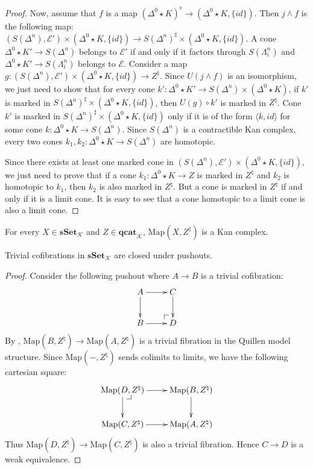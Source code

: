 \documentclass[reqno]{amsart}
\makeatletter
\theoremstyle{definition}
\theoremstyle{remark}
\newcommand{\cat}[1]{\mathbf{#1}}
\newcommand{\sSet}{\cat{sSet}}
\newcommand{\csSet}{\sSet_\mathcal{K}}
\newcommand{\cqCat}{\cat{qcat}_\mathcal{K}}
\newcommand{\join}{\star}
\newcommand{\Map}{\mathrm{Map}}
\numberwithin{figure}{section}
\newcommand{\pb}[1][dr]{\save*!/#1-1.2pc/#1:(-1,1)@^{|-}\restore}
\newcommand{\po}[1][dr]{\save*!/#1+1.2pc/#1:(1,-1)@^{|-}\restore}
\makeatother
\begin{document}
\begin{proof}
Now, assume that $f$ is a map $(\Delta^0 \join K)^\flat \to (\Delta^0 \join K, \{ id \})$.
Then $j \wedge f$ is the following map: $(S(\Delta^n),\mathcal{E}') \times (\Delta^0 \join K, \{ id \}) \to S(\Delta^n)^\sharp \times (\Delta^0 \join K, \{ id \})$.
A cone $\Delta^0 \join K' \to S(\Delta^n)$ belongs to $\mathcal{E}'$ if and only if it factors through $S(\Lambda^n_i)$ and $\Delta^0 \join K' \to S(\Lambda^n_i)$ belongs to $\mathcal{E}$.
Consider a map $g : (S(\Delta^n),\mathcal{E}') \times (\Delta^0 \join K, \{ id \}) \to Z^\natural$.
Since $U(j \wedge f)$ is an isomorphism, we just need to show that for every cone $k' : \Delta^0 \join K' \to S(\Delta^n) \times (\Delta^0 \join K)$,
if $k'$ is marked in $S(\Delta^n)^\sharp \times (\Delta^0 \join K, \{ id \})$, then $U(g) \circ k'$ is marked in $Z^\natural$.
Cone $k'$ is marked in $S(\Delta^n)^\sharp \times (\Delta^0 \join K, \{ id \})$ only if it is of the form $\langle k, id \rangle$ for some cone $k : \Delta^0 \join K \to S(\Delta^n)$.
Since $S(\Delta^n)$ is a contractible Kan complex, every two cones $k_1,k_2 : \Delta^0 \join K \to S(\Delta^n)$ are homotopic.

Since there exists at least one marked cone in $(S(\Delta^n),\mathcal{E}') \times (\Delta^0 \join K, \{ id \})$,
we just need to prove that if a cone $k_1 : \Delta^0 \join K \to Z$ is marked in $Z^\natural$ and $k_2$ is homotopic to $k_1$, then $k_2$ is also marked in $Z^\natural$.
But a cone is marked in $Z^\natural$ if and only if it is a limit cone.
It is easy to see that a cone homotopic to a limit cone is also a limit cone.
\end{proof}

\begin{cor}
For every $X \in \csSet$ and $Z \in \cqCat$, $\Map(X,Z^\natural)$ is a Kan complex.
\end{cor}

\begin{cor}
Trivial cofibrations in $\csSet$ are closed under pushouts.
\end{cor}
\begin{proof}
Consider the following pushout where $A \to B$ is a trivial cofibration:
\[ \xymatrix{ A \ar[r] \ar[d] & C \ar[d] \\
              B \ar[r]        & \po D
            } \]
By , $\Map(B,Z^\natural) \to \Map(A,Z^\natural)$ is a trivial fibration in the Quillen model structure.
Since $\Map(-,Z^\natural)$ sends colimits to limits, we have the following cartesian square:
\[ \xymatrix{ \Map(D,Z^\natural) \ar[r] \ar[d] \pb & \Map(B,Z^\natural) \ar[d] \\
              \Map(C,Z^\natural) \ar[r]            & \Map(A,Z^\natural)
            } \]
Thus $\Map(D,Z^\natural) \to \Map(C,Z^\natural)$ is also a trivial fibration.
Hence $C \to D$ is a weak equivalence.
\end{proof}
\end{document}
